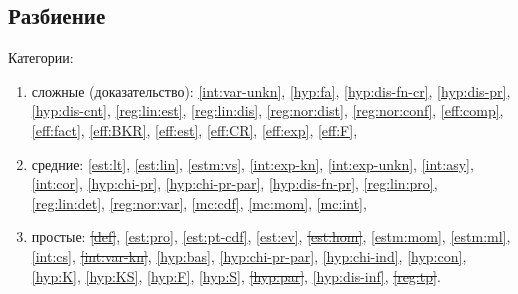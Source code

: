 \documentclass[a4paper,12pt]{article}
\begin{document}
    \subsection{Разбиение}
    Категории:
    \begin{enumerate}
        \item сложные (доказательство):
              \ref{int:var-unkn},
              \ref{hyp:fa},
              \ref{hyp:dis-fn-cr},
              \ref{hyp:dis-pr},
              \ref{hyp:dis-cnt},
              \ref{reg:lin:est},
              \ref{reg:lin:dis},
              \ref{reg:nor:dist},
              \ref{reg:nor:conf},
              \ref{eff:comp},
              \ref{eff:fact},
              \ref{eff:BKR},
              \ref{eff:est},
              \ref{eff:CR},
              \ref{eff:exp},
              \ref{eff:F},

        \item средние:
              \ref{est:lt},
              \ref{est:lin},
              \ref{estm:vs},
              \ref{int:exp-kn},
              \ref{int:exp-unkn},
              \ref{int:asy},
              \ref{int:cor},
              \ref{hyp:chi-pr},
              \ref{hyp:chi-pr-par},
              \ref{hyp:dis-fn-pr},
              \ref{reg:lin:pro},
              \ref{reg:lin:det},
              \ref{reg:nor:var},
              \ref{mc:cdf},
              \ref{mc:mom},
              \ref{mc:int},

        \item простые:
              \sout{\ref{def}},
              \ref{est:pro},
              \ref{est:pt-cdf},
              \ref{est:ev},
              \sout{\ref{est:hom}},
              \ref{estm:mom},
              \ref{estm:ml},
              \ref{int:cs},
              \sout{\ref{int:var-kn}},
              \ref{hyp:bas},
              \ref{hyp:chi-pr-par},
              \ref{hyp:chi-ind},
              \ref{hyp:con},
              \ref{hyp:K},
              \ref{hyp:KS},
              \ref{hyp:F},
              \ref{hyp:S},
              \sout{\ref{hyp:par}},
              \ref{hyp:dis-inf},
              \sout{\ref{reg:tp}}.
    \end{enumerate}
\end{document}
